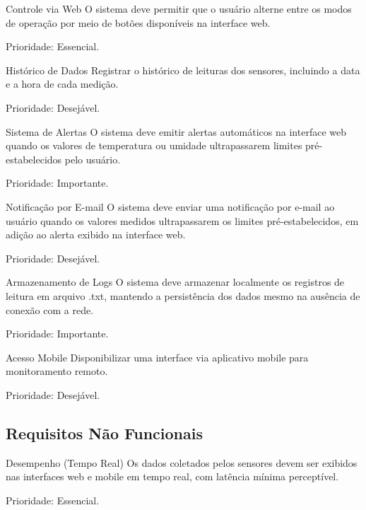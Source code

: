 \begin{rfreq}{Controle via Web}
    O sistema deve permitir que o usuário alterne entre os modos de operação por meio de botões disponíveis na interface web.
    
    Prioridade: Essencial.
\end{rfreq}

\begin{rfreq}{Histórico de Dados}
    Registrar o histórico de leituras dos sensores, incluindo a data e a hora de cada medição.
    
    Prioridade: Desejável.
\end{rfreq}

\begin{rfreq}{Sistema de Alertas}
    O sistema deve emitir alertas automáticos na interface web quando os valores de temperatura ou umidade ultrapassarem limites pré-estabelecidos pelo usuário.
    
    Prioridade: Importante.
\end{rfreq}

\begin{rfreq}{Notificação por E-mail}
    O sistema deve enviar uma notificação por e-mail ao usuário quando os valores medidos ultrapassarem os limites pré-estabelecidos, em adição ao alerta exibido na interface web.

    Prioridade: Desejável.
\end{rfreq}

\begin{rfreq}{Armazenamento de Logs}
    O sistema deve armazenar localmente os registros de leitura em arquivo .txt, mantendo a persistência dos dados mesmo na ausência de conexão com a rede.
    
    Prioridade: Importante.
\end{rfreq}

\begin{rfreq}{Acesso Mobile}
    Disponibilizar uma interface via aplicativo mobile para monitoramento remoto.

    Prioridade: Desejável.
\end{rfreq}


\subsection{Requisitos Não Funcionais}

\begin{nfreq}{Desempenho (Tempo Real)}
    Os dados coletados pelos sensores devem ser exibidos nas interfaces web e mobile em tempo real, com latência mínima perceptível.
    
    Prioridade: Essencial.
\end{nfreq}

